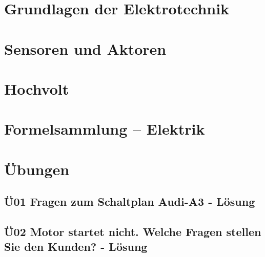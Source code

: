 



\chapter{Grundlagen der Elektrotechnik}

\chapter{Sensoren und Aktoren}

\chapter{Hochvolt}


\chapter{Formelsammlung -- Elektrik}


\chapter{Übungen}
\section{Ü01 Fragen zum Schaltplan Audi-A3 - Lösung}

\section{Ü02 Motor startet nicht. Welche Fragen stellen Sie den Kunden? - Lösung}

